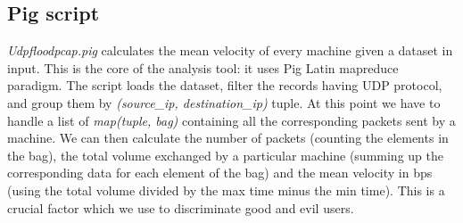 \subsection{Pig script}
\textit{Udpfloodpcap.pig} calculates the mean velocity of every machine given a dataset in input. This is the core of the analysis tool: it uses Pig Latin mapreduce paradigm. The script loads the dataset, filter the records having UDP protocol, and group them by \textit{(source\_ip, destination\_ip)} tuple. At this point we have to handle a list of \textit{map(tuple, bag)} containing all the corresponding packets sent by a machine. We can then calculate the number of packets (counting the elements in the bag), the total volume exchanged by a particular machine (summing up the corresponding data for each element of the bag) and the mean velocity in bps (using the total volume divided by the max time minus the min time). This is a crucial factor which we use to discriminate good and evil users.







